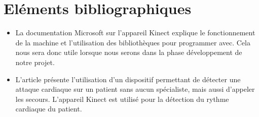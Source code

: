 \documentclass[12 pt]{article}
\begin{document}
\section{Eléments bibliographiques}
\begin{itemize}

\item La documentation \cite{Kinect} Microsoft sur l'appareil Kinect explique le fonctionnement de la machine et l'utilisation des bibliothèques pour programmer avec. Cela nous sera donc utile lorsque nous serons dans la phase développement de notre projet.
\newline
\item L'article \cite{Patel14} présente l'utilisation d'un dispositif permettant de détecter une attaque cardiaque sur un patient sans aucun spécialiste, mais aussi d'appeler les secours. L'appareil Kinect est utilisé pour la détection du rythme cardiaque du patient.
\newline


\end{itemize}
\end{document}
